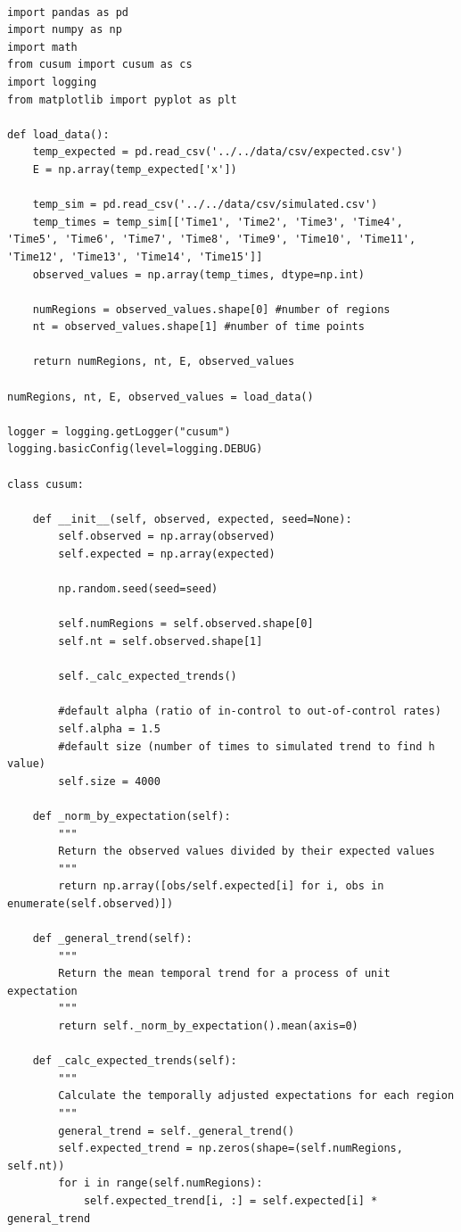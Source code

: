 \documentclass[11pt]{report}
\begin{document}
\begin{verbatim}

import pandas as pd
import numpy as np
import math
from cusum import cusum as cs
import logging
from matplotlib import pyplot as plt

def load_data():
    temp_expected = pd.read_csv('../../data/csv/expected.csv')
    E = np.array(temp_expected['x'])
    
    temp_sim = pd.read_csv('../../data/csv/simulated.csv')
    temp_times = temp_sim[['Time1', 'Time2', 'Time3', 'Time4', 'Time5', 'Time6', 'Time7', 'Time8', 'Time9', 'Time10', 'Time11', 'Time12', 'Time13', 'Time14', 'Time15']]
    observed_values = np.array(temp_times, dtype=np.int)
    
    numRegions = observed_values.shape[0] #number of regions
    nt = observed_values.shape[1] #number of time points
    
    return numRegions, nt, E, observed_values

numRegions, nt, E, observed_values = load_data()

logger = logging.getLogger("cusum")
logging.basicConfig(level=logging.DEBUG)

class cusum:

    def __init__(self, observed, expected, seed=None):
        self.observed = np.array(observed)
        self.expected = np.array(expected)

        np.random.seed(seed=seed)

        self.numRegions = self.observed.shape[0]
        self.nt = self.observed.shape[1]

        self._calc_expected_trends()

        #default alpha (ratio of in-control to out-of-control rates)
        self.alpha = 1.5
        #default size (number of times to simulated trend to find h value)
        self.size = 4000
        
    def _norm_by_expectation(self):
        """
        Return the observed values divided by their expected values
        """
        return np.array([obs/self.expected[i] for i, obs in enumerate(self.observed)])

    def _general_trend(self):
        """
        Return the mean temporal trend for a process of unit expectation
        """
        return self._norm_by_expectation().mean(axis=0)

    def _calc_expected_trends(self):
        """
        Calculate the temporally adjusted expectations for each region
        """
        general_trend = self._general_trend()
        self.expected_trend = np.zeros(shape=(self.numRegions, self.nt))
        for i in range(self.numRegions):
            self.expected_trend[i, :] = self.expected[i] * general_trend 


\end{verbatim}
\end{document}
